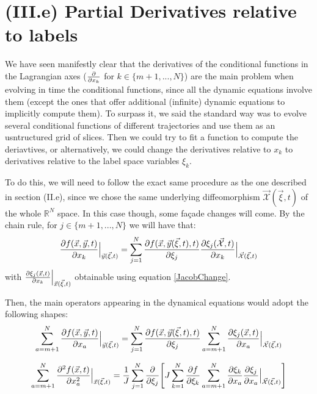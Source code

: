 \documentclass[11pt, a4paper]{article} %
\newcommand{\R}{\mathbb{R}} %
\newcommand{\x}{\mathcal{X}}
\begin{document}
\newpage
\section*{(III.e) Partial Derivatives relative to labels\vspace{-0.1cm}}
We have seen manifestly clear that the derivatives of the conditional functions in the Lagrangian axes ($\pdv{}{x_k}$ for $k\in\{m+1,...,N \}$) are the main problem when evolving in time the conditional functions, since all the dynamic equations involve them (except the ones that offer additional (infinite) dynamic equations to implicitly compute them). To surpass it, we said the standard way was to evolve several conditional functions of different trajectories and use them as an usntructured grid of slices. Then we could try to fit a function to compute the deriavtives, or alternatively, we could change the derivatives relative to $x_k$ to derivatives relative to the label space variables $\xi_k$.

To do this, we will need to follow the exact same procedure as the one described in section (II.e), since we chose the same underlying diffeomorphism $\vec{\x}(\vec{\xi},t)$ of the whole $\R^N$ space. In this case though, some façade changes will come. By the chain rule, for $j\in\{m+1,...,N \}$ we will have that:
\begin{equation}
\pdv{f(\vec{x}, \vec{y},t)}{x_k}\Big\rvert_{\vec{y}(\vec{\xi},t)}=\sum_{j=1}^N \pdv{f(\vec{x},\vec{y}(\vec{\xi},t),t)}{\xi_j} \pdv{\xi_j(\vec{\x},t)}{x_k}\Big\rvert_{\vec{\x}(\vec{\xi},t)}
\end{equation}
with $\pdv{\xi_j(\vec{x},t)}{x_k}\Big\rvert_{\vec{x}(\vec{\xi},t)}$ obtainable using equation \eqref{JacobChange}.

Then, the main operators appearing in the dynamical equations would adopt the following shapes:
\begin{equation}
\sum_{a=m+1}^N \pdv{f(\vec{x}, \vec{y},t)}{x_a}\Big\rvert_{\vec{y}(\vec{\xi},t)} = \sum_{j=1}^N \pdv{f(\vec{x}, \vec{y}(\vec{\xi},t),t)}{\xi_j} \sum_{a=m+1}^N \pdv{\xi_j(\vec{x},t)}{x_a}\Big\rvert_{\vec{\x}(\vec{\xi},t)}
\end{equation}

\begin{equation}
\sum_{a=m+1}^N \pdv[2]{f(\vec{x},t)}{x_a}\Big\rvert_{\vec{x}(\vec{\xi},t)}=\frac{1}{J} \sum_{j=1}^N\pdv{}{\xi_j} \qty[ J\sum_{k=1}^N\pdv{f}{\xi_k}\sum_{a=m+1}^N\pdv{\xi_k}{x_a}\pdv{\xi_j}{x_a}\Big\rvert_{\vec{\x}(\vec{\xi},t)}]
\end{equation}
\end{document}
